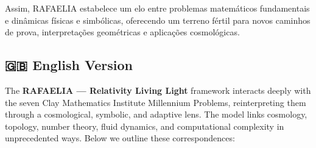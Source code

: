Assim, RAFAELIA estabelece um elo entre problemas matemáticos fundamentais e dinâmicas físicas e simbólicas, oferecendo um terreno fértil para novos caminhos de prova, interpretações geométricas e aplicações cosmológicas.

\subsection*{🇬🇧 English Version}

The \textbf{RAFAELIA — Relativity Living Light} framework interacts deeply with the seven Clay Mathematics Institute Millennium Problems, reinterpreting them through a cosmological, symbolic, and adaptive lens. The model links cosmology, topology, number theory, fluid dynamics, and computational complexity in unprecedented ways. Below we outline these correspondences:

